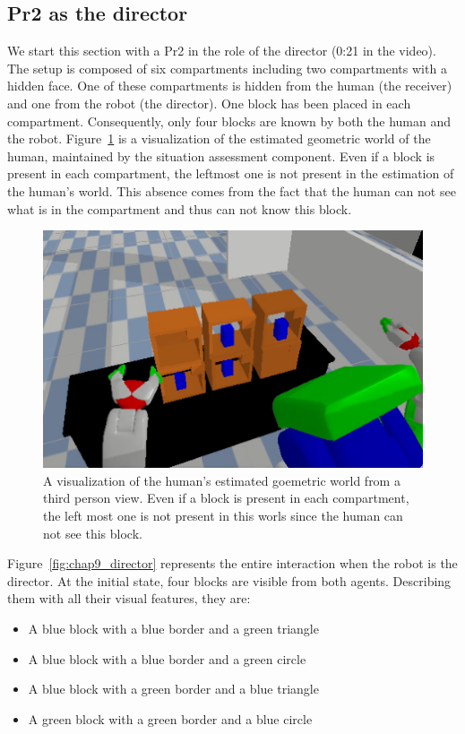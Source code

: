 \subsection{Pr2 as the director}

We start this section with a Pr2 in the role of the director (0:21 in the video). The setup is composed of six compartments including two compartments with a hidden face. One of these compartments is hidden from the human (the receiver) and one from the robot (the director). One block has been placed in each compartment. Consequently, only four blocks are known by both the human and the robot. Figure~\ref{fig:chap9_robot_view} is a visualization of the estimated geometric world of the human, maintained by the situation assessment component. Even if a block is present in each compartment, the leftmost one is not present in the estimation of the human's world. This absence comes from the fact that the human can not see what is in the compartment and thus can not know this block.

\begin{figure}[ht!]
\centering
\includegraphics[scale=0.5]{figures/chapter9/robot_view.png}
\caption{\label{fig:chap9_robot_view} A visualization of the human's estimated goemetric world from a third person view. Even if a block is present in each compartment, the left most one is not present in this worls since the human can not see this block. }
\end{figure}

Figure~\ref{fig:chap9_director} represents the entire interaction when the robot is the director. At the initial state, four blocks are visible from both agents. Describing them with all their visual features, they are:

\begin{itemize}
  \item A blue block with a blue border and a green triangle
  \item A blue block with a blue border and a green circle
  \item A blue block with a green border and a blue triangle
  \item A green block with a green border and a blue circle
\end{itemize}

